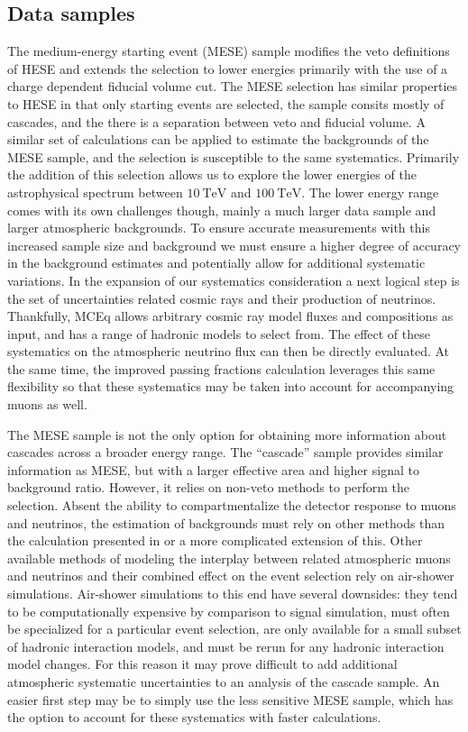 \subsection{Data samples}
The medium-energy starting event (MESE) sample modifies the veto definitions of HESE and extends the selection to lower energies primarily with the use of a charge dependent fiducial volume cut.
The MESE selection has similar properties to HESE in that only starting events are selected, the sample consits mostly of cascades, and the there is a separation between veto and fiducial volume.
A similar set of calculations can be applied to estimate the backgrounds of the MESE sample, and the selection is susceptible to the same systematics.
Primarily the addition of this selection allows us to explore the lower energies of the astrophysical spectrum between $\SI{10}\TeV$ and $\SI{100}\TeV$.
The lower energy range comes with its own challenges though, mainly a much larger data sample and larger atmospheric backgrounds.
To ensure accurate measurements with this increased sample size and background we must ensure a higher degree of accuracy in the background estimates and potentially allow for additional systematic variations.
In the expansion of our systematics consideration a next logical step is the set of uncertainties related cosmic rays and their production of neutrinos.
Thankfully, MCEq allows arbitrary cosmic ray model fluxes and compositions as input, and has a range of hadronic models to select from. The effect of these systematics on the atmospheric neutrino flux can then be directly evaluated.
At the same time, the improved passing fractions calculation leverages this same flexibility so that these systematics may be taken into account for accompanying muons as well.

The MESE sample is not the only option for obtaining more information about cascades across a broader energy range.
The ``cascade'' sample provides similar information as MESE, but with a larger effective area and higher signal to background ratio.
However, it relies on non-veto methods to perform the selection.
Absent the ability to compartmentalize the detector response to muons and neutrinos, the estimation of backgrounds must rely on other methods than the calculation presented in  or a more complicated extension of this.
Other available methods of modeling the interplay between related atmospheric muons and neutrinos and their combined effect on the event selection rely on air-shower simulations.
Air-shower simulations to this end have several downsides: they tend to be computationally expensive by comparison to signal simulation, must often be specialized for a particular event selection, are only available for a small subset of hadronic interaction models, and must be rerun for any hadronic interaction model changes.
For this reason it may prove difficult to add additional atmospheric systematic uncertainties to an analysis of the cascade sample.
An easier first step may be to simply use the less sensitive MESE sample, which has the option to account for these systematics with faster calculations.

